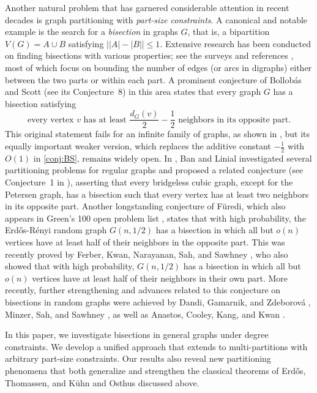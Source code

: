 \documentclass{aic}
\begin{document}
	
	Another natural problem that has garnered considerable attention in recent decades is graph partitioning with {\it part-size constraints}.
	A canonical and notable example is the search for a {\it bisection} in graphs $G$, that is, a bipartition $V(G) = A \cup B$ satisfying $\big||A| - |B|\big| \leq 1$.
	Extensive research has been conducted on finding bisections with various properties; see the surveys \cite{BS,Scott} and references \cite{DPS,FHY,HW21,HWY,LLS,LZ,LMZ,XY}, most of which focus on bounding the number of edges (or arcs in digraphs) either between the two parts or within each part.
	A prominent conjecture of Bollob\'as and Scott \cite{BS} (see its Conjecture~8) in this area states that every graph $G$ has a bisection satisfying \begin{equation}\label{conj:BS}
		\mbox{every vertex $v$ has at least $\frac{d_G(v)}{2}-\frac{1}{2}$ neighbors in its opposite part.}
	\end{equation}
	This original statement fails for an infinite family of graphs, as shown in \cite{JMYY}, but its equally important weaker version, which replaces the additive constant $-\frac{1}{2}$ with $O(1)$ in \eqref{conj:BS}, remains widely open.
	In \cite{BL}, Ban and Linial investigated several partitioning problems for regular graphs and proposed a related conjecture (see Conjecture~1 in \cite{BL}), asserting that every bridgeless cubic graph, except for the Petersen graph, has a bisection such that every vertex has at least two neighbors in its opposite part.
	Another longstanding conjecture of F\"uredi, which also appears in Green's 100 open problem list \cite{Green},
	states that with high probability, the Erd\H{o}s-R\'enyi random graph $G(n,1/2)$ has a bisection in which all but $o(n)$ vertices have at least half of their neighbors in the opposite part.
	This was recently proved by Ferber, Kwan, Narayanan, Sah, and Sawhney \cite{FKNSS}, who also showed that with high probability, $G(n,1/2)$ has a bisection in which all but $o(n)$ vertices have at least half of their neighbors in their own part.
	More recently, further strengthening and advances related to this conjecture on bisections in random graphs were achieved by Dandi, Gamarnik, and Zdeborov\'a \cite{DGZ}, Minzer, Sah, and Sawhney \cite{MSS}, as well as Anastos, Cooley, Kang, and Kwan \cite{ACKK}.
	
	
	In this paper, we investigate bisections in general graphs under degree constraints.
	We develop a unified approach that extends to multi-partitions with arbitrary part-size constraints.
	Our results also reveal new partitioning phenomena that both generalize and strengthen the classical theorems of Erd\H{o}s, Thomassen, and K\"{u}hn and Osthus discussed above.
	
\end{document}
